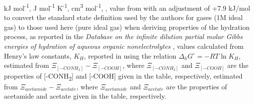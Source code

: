 {\begin{table}
\begin{threeparttable}
\begin{tablenotes}
     kJ mol\textsuperscript{-1},
     J mol\textsuperscript{-1} K\textsuperscript{-1},
     cm\textsuperscript{3} mol\textsuperscript{-1},
     \cite{dick2006temperature},
     value from \cite{cabani1981group} with an adjustment of +7.9 kJ/mol to convert the standard state definition used by the authors for gases (1M ideal gas) to those used here (pure ideal gas) when deriving properties of the hydration process, as reported in the \textit{Database on the infinite dilution  partial  molar Gibbs  energies of hydration of aqueous organic nonelectrolytes} \citep{sedlbauer2012database, sedlbauer2002group},
     values calculated from Henry's law constants, $K_{H}$, reported in \cite{khan1992henry} using the relation $\Delta_{h}G^{\circ} = -RT\ln{K_{H}}$,
     estimated from $\Xi_{[-CONH_{2}]} - \Xi_{[-COOH]}$, where $\Xi_{[-CONH_{2}]}$ and $\Xi_{[-COOH]}$ are the properties of [-CONH\textsubscript{2}] and [-COOH] given in the table, respectively,
     estimated from $\Xi_{acetamide} - \Xi_{acetate}$, where $\Xi_{acetamide}$ and $\Xi_{acetate}$ are the properties of acetamide and acetate given in the table, respectively.
    
        
  \end{tablenotes}
  
  \label{tab:amide}
  \end{threeparttable}
\end{table}
\setcounter{tabcounter}{0} %
\doublespace
\clearpage
}


